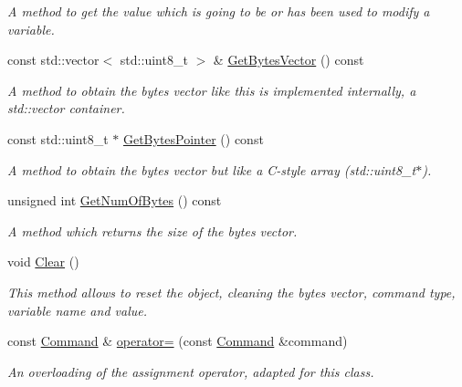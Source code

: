 \begin{DoxyCompactItemize}
\begin{DoxyCompactList}\small\item\em A method to get the value which is going to be or has been used to modify a variable. \end{DoxyCompactList}\item 
\mbox{\label{classCommand_a56e9f53a7d1b9c0e47b51ac61aaad400}} 
const std\+::vector$<$ std\+::uint8\+\_\+t $>$ \& \hyperlink{classCommand_a56e9f53a7d1b9c0e47b51ac61aaad400}{Get\+Bytes\+Vector} () const
\begin{DoxyCompactList}\small\item\em A method to obtain the bytes vector like this is implemented internally, a {\ttfamily std\+::vector} container. \end{DoxyCompactList}\item 
const std\+::uint8\+\_\+t $\ast$ \hyperlink{classCommand_a3bb0b48bb03f1fe5b32d119ebc64a71b}{Get\+Bytes\+Pointer} () const
\begin{DoxyCompactList}\small\item\em A method to obtain the bytes vector but like a C-\/style array ({\ttfamily std\+::uint8\+\_\+t$\ast$}). \end{DoxyCompactList}\item 
\mbox{\label{classCommand_a6f526ceab284f63416ebe9e173ae665b}} 
unsigned int \hyperlink{classCommand_a6f526ceab284f63416ebe9e173ae665b}{Get\+Num\+Of\+Bytes} () const
\begin{DoxyCompactList}\small\item\em A method which returns the size of the bytes vector. \end{DoxyCompactList}\item 
\mbox{\label{classCommand_af14e3fe4a4cd1c474419693bf6f26650}} 
void \hyperlink{classCommand_af14e3fe4a4cd1c474419693bf6f26650}{Clear} ()
\begin{DoxyCompactList}\small\item\em This method allows to reset the object, cleaning the bytes vector, command type, variable name and value. \end{DoxyCompactList}\item 
const \hyperlink{classCommand}{Command} \& \hyperlink{classCommand_ac3345fe77bca04644aaddcf2de835f34}{operator=} (const \hyperlink{classCommand}{Command} \&command)
\begin{DoxyCompactList}\small\item\em An overloading of the assignment operator, adapted for this class. \end{DoxyCompactList}\end{DoxyCompactItemize}


